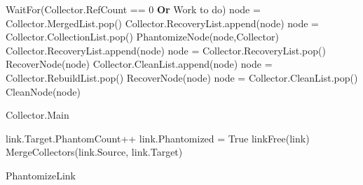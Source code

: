 \setlength{\textfloatsep}{0pt}
\begin{algorithm}[H]
	\scriptsize
	
	\begin{multicols}{2}
		\begin{algorithmic}[1]
{}
\State WaitFor(Collector.RefCount == 0 {\bf Or} Work to do)
\EndIf
{}
\State node = Collector.MergedList.pop()
\State Collector.RecoveryList.append(node)
\EndWhile
{}
\State node = Collector.CollectionList.pop()
\State PhantomizeNode(node,Collector)
\State Collector.RecoveryList.append(node)
\EndWhile
{}
\State node = Collector.RecoveryList.pop()
\State RecoverNode(node)
\State Collector.CleanList.append(node)
\EndWhile
{}
\State node = Collector.RebuildList.pop()
\State RecoverNode(node)
\EndWhile
{}
\State node = Collector.CleanList.pop()
\State CleanNode(node)
\EndWhile
\EndWhile
\EndProcedure
\caption{Collector.Main}
\label{algorithm:main}
\end{algorithmic}
\end{multicols}
\end{algorithm}
\setlength{\textfloatsep}{0pt}


\begin{algorithm}[H]
	\scriptsize
	
	\begin{multicols}{2}
		\begin{algorithmic}[1]
{}
\EndIf
{}
\EndIf
\State link.Target.PhantomCount++
\State link.Phantomized = True
\State linkFree(link)
\State MergeCollectors(link.Source, link.Target)
\EndProcedure
\caption{PhantomizeLink}
\label{single:algorithm:phantomizelink}
\end{algorithmic}
\end{multicols}
\end{algorithm}



